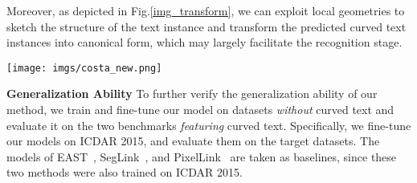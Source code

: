\documentclass[runningheads]{llncs}
\begin{document}
Moreover, as depicted in Fig.\ref{img_transform}, we can exploit local geometries to sketch the structure of the text instance and transform the predicted curved text instances into canonical form, which may largely facilitate the recognition stage.

\begin{figure*}
\begin{centering}
\vspace{-3mm}
\texttt{[image: imgs/costa\_new.png]}
\par\end{centering}
\vspace{-3mm}
\caption{Text instances transformed to canonical form using the predicted geometries.} \label{img_transform}
\vspace{-0mm}
\end{figure*}

\noindent\textbf{Generalization Ability} To further verify the generalization ability of our method, we train and fine-tune our model on datasets \textit{without} curved text and evaluate it on the two benchmarks \textit{featuring} curved text. Specifically, we fine-tune our models on ICDAR 2015, and evaluate them on the target datasets. The models of EAST~\cite{Zhou_2017_CVPR},  SegLink~\cite{Shi_2017_CVPR}, and PixelLink~\cite{deng2018pixellink} are taken as baselines, since these two methods were also trained on ICDAR 2015. 
\end{document}
